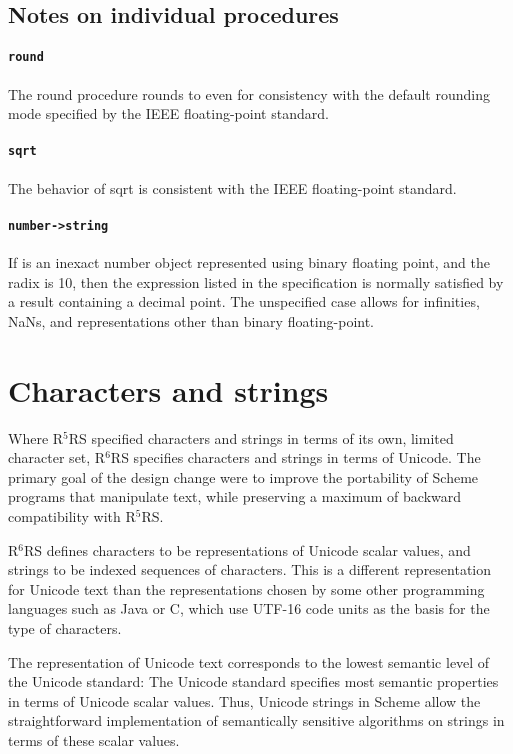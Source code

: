 \documentclass[twoside,twocolumn]{algol60}
\newcommand{\rn}[1]{R$^{#1}$RS}
\begin{document}
\subsection{Notes on individual procedures}

\paragraph{{\tt round}}

The {\cf round} procedure rounds to even for consistency with the
default rounding mode specified by the IEEE floating-point standard.

\paragraph{{\tt sqrt}}

The behavior of {\cf sqrt} is consistent with the IEEE floating-point
standard.

\paragraph{{\tt number->string}}

If  is an inexact number object represented using binary floating
point, and the radix is 10, then the expression listed in the
specification is normally satisfied by a result containing a decimal
point.  The unspecified case allows for infinities, NaNs, and
representations other than binary floating-point.

\section{Characters and strings}

Where \rn{5} specified characters and strings in terms of its own,
limited character set, \rn{6} specifies characters and strings in
terms of Unicode.  The primary goal of the design change were to
improve the portability of Scheme programs that manipulate text, while
preserving a maximum of backward compatibility with \rn{5}.

\rn{6} defines characters to be representations of Unicode scalar
values, and strings to be indexed sequences of characters.  This is a
different representation for Unicode text than the representations
chosen by some other programming languages such as Java or
C\sharpsign{}, which use UTF-16 code units as the basis for the type
of characters.

The representation of Unicode text corresponds to the lowest semantic
level of the Unicode standard: The Unicode standard specifies most
semantic properties in terms of Unicode scalar values.  Thus, Unicode
strings in Scheme allow the straightforward implementation of
semantically sensitive algorithms on strings in terms of these scalar
values.
\end{document}
